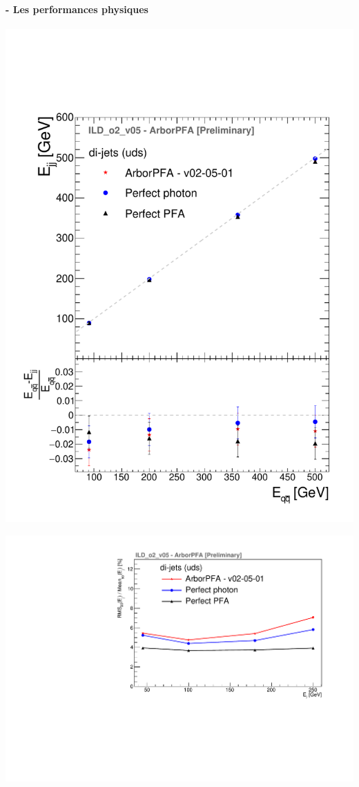 \documentclass[8pt]{beamer}
\begin{document}
  \begin{frame}
  \frametitle{\secname}
  \framesubtitle{\subsecname - Les performances physiques}
    \begin{minipage}{0.49\linewidth}
      \begin{center}
        \includegraphics[width=\linewidth]{ILDArborPFA_ErecConfusions_NoNeutralHadron.pdf}
      \end{center}
    \end{minipage}
    \begin{minipage}{0.49\linewidth}
      \begin{center}
        \includegraphics[width=\linewidth]{ILDArborPFA_EResol_NoNeutralHadron.pdf}

\end{center}
\end{minipage}
\end{frame}
\end{document}
